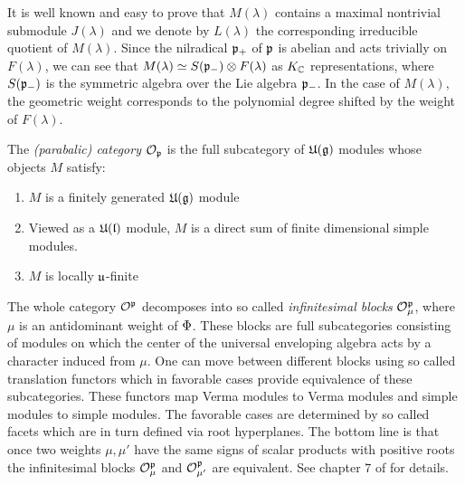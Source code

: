  It is well known and easy to prove that $M(\lambda)$ contains a maximal nontrivial submodule $J(\lambda)$ and we denote by $L(\lambda)$ the corresponding irreducible quotient of $M(\lambda)$. Since the nilradical $\mathfrak{p}_+$ of $\mathfrak{p}$ is abelian and acts trivially on $F(\lambda)$, we can see that $M(\lambda) \simeq S(\mathfrak{p}_-)\otimes F(\lambda)$ as $K_{\mathbb{C}}$ representations, where $S(\mathfrak{p}_-)$ is the symmetric algebra  over the Lie algebra $\mathfrak{p}_-$.
In the case of $M(\lambda)$, the geometric weight corresponds to the polynomial degree shifted by the weight of $F(\lambda)$.%

The \emph{(parabalic) category $\mathcal{O}_{\mathfrak{p}}$} is the full subcategory of $\mathfrak{U(g)}$ modules whose objects $M$ satisfy:
\begin{enumerate}
\item $M$ is a finitely generated $\mathfrak{U(g)}$ module
\item Viewed as a $\mathfrak{U(l)}$ module, $M$ is a direct sum of finite dimensional simple modules.
\item $M$ is locally $\mathfrak{u}$-finite
\end{enumerate}

The whole category $\mathcal{O}^ {\mathfrak{p}}$ decomposes into so called \emph{infinitesimal blocks} $\mathcal{O}^{\mathfrak{p}}_\mu$, where $\mu$ is an antidominant weight of $\Phi$. These blocks are full subcategories consisting of modules on which the center of the universal enveloping algebra acts by a character induced from $\mu$.  One can move between different blocks using so called translation functors which in favorable cases provide equivalence of these subcategories. These functors map Verma modules to Verma modules and simple modules to simple modules. The favorable cases are determined by so called facets which are in turn defined via root hyperplanes. The bottom line is that once two weights $\mu, \mu'$ have the same signs of scalar products with positive roots the infinitesimal blocks $\mathcal{O}^{\mathfrak{p}}_\mu$ and $\mathcal{O}^{\mathfrak{p}}_{\mu'}$ are equivalent. See chapter 7 of \cite{humphreys_representations_2008} for details.

